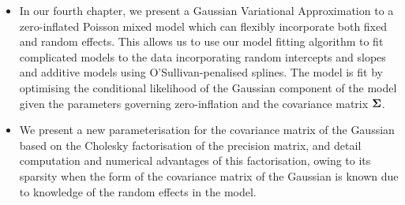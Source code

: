 \begin{itemize}
\item In our fourth chapter, we present a Gaussian Variational Approximation to
a zero-inflated Poisson mixed model which can flexibly incorporate both fixed
and random effects. This allows us to use our model fitting algorithm to fit
complicated models to the data incorporating random intercepts and slopes and
additive models using O'Sullivan-penalised splines.  The model is fit by
optimising the conditional likelihood of the Gaussian component of the model
given the parameters governing zero-inflation and the covariance matrix
${\boldsymbol \Sigma}$.

\item We present a new parameterisation for the covariance matrix of the
Gaussian based on the Cholesky factorisation of the precision matrix, and detail
computation and numerical advantages of this factorisation, owing to its
sparsity when the form of the covariance matrix of the Gaussian is known due to
knowledge of the random effects in the model.

\end{itemize}
